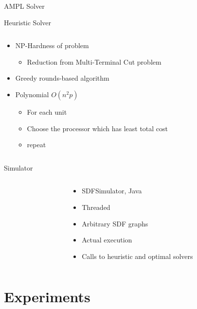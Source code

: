 \documentclass{beamer}
\begin{document}
\begin{frame}{AMPL Solver}

\end{frame}

\begin{frame}{Heuristic Solver}
\begin{columns}
\begin{column}{5cm}
\begin{itemize}
	\item NP-Hardness of problem
		\begin{itemize}
			\item Reduction from Multi-Terminal Cut problem
		\end{itemize}
	\item Greedy rounds-based algorithm
	\item Polynomial $O(n^2 p)$
		\begin{itemize}
			\item For each unit
			\item Choose the processor which has least total cost
			\item repeat
		\end{itemize}
\end{itemize}
\end{column}
\begin{column}{5cm}
\end{column}
\end{columns}
\end{frame}

\begin{frame}{Simulator}
\begin{columns}
\begin{column}{5cm}
\end{column}
\begin{column}{5cm}
\begin{itemize}
	\item SDFSimulator, Java
	\item Threaded
	\item Arbitrary SDF graphs
	\item Actual execution
	\item Calls to heuristic and optimal solvers
\end{itemize}
\end{column}
\end{columns}
\end{frame}

\section{Experiments}
\end{document}
